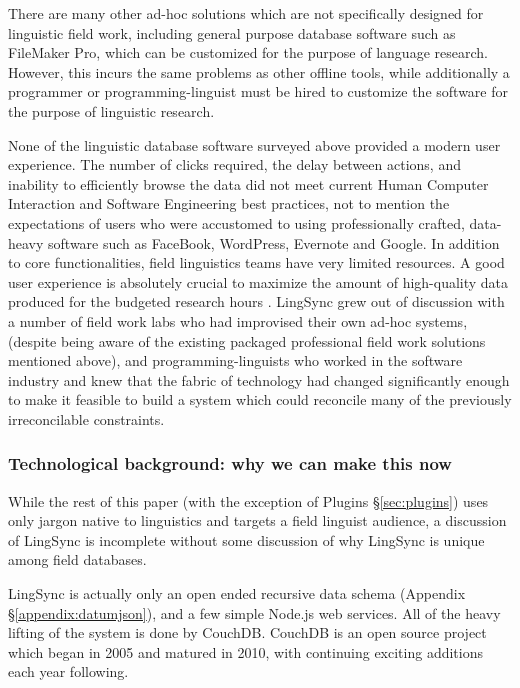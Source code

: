 \documentclass[letterpaper, 12pt, dvips]{mitwpl}
\begin{document}
There are many other ad-hoc solutions which are not specifically designed for linguistic field work, including general purpose database software such as FileMaker Pro,
which can be customized for the purpose of language research.
However,
this incurs the same problems as other offline tools,
while additionally a programmer or programming-linguist must be hired to customize the software for the purpose of linguistic research.

None of the linguistic database software surveyed above provided a modern user experience.
The number of clicks required, the delay between actions, and inability to efficiently browse the data did not meet current
Human Computer Interaction and Software Engineering best practices, 
not to mention the expectations of users who were accustomed to using professionally crafted, data-heavy software such as FaceBook, WordPress, Evernote and Google. %
In addition to core functionalities, field linguistics teams have very limited resources. 
A good user
experience is absolutely crucial to maximize the amount of high-quality data produced for the budgeted research hours \citep{Palmer:2009}. 
LingSync grew
out of discussion with a number of field work labs who had improvised their own ad-hoc systems, 
(despite being aware of the existing packaged professional field work solutions mentioned above), 
and programming-linguists who worked in the software industry and knew that the fabric of technology had changed significantly enough to make it feasible to build a system which could reconcile many of the previously irreconcilable constraints.


\subsubsection{Technological background: why we can make this now} 

While the rest of this paper (with the exception of Plugins \S \ref{sec:plugins}) uses only jargon native to linguistics and targets a field linguist audience, a discussion of LingSync is incomplete without some discussion of why LingSync is unique among field databases.

LingSync is actually only an open ended recursive data schema (Appendix \S \ref{appendix:datumjson}), and a few simple Node.js web services. All of the heavy lifting of the system is done by CouchDB. CouchDB is an open source  project which began in 2005 and matured in 2010, with continuing exciting additions each year following. 
\end{document}
